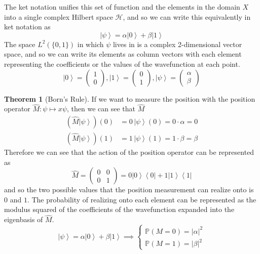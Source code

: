 \documentclass{article}
\newcommand{\ket}[1]{\ensuremath{\left|#1\right\rangle}}
\newcommand{\bra}[1]{\ensuremath{\left\langle#1\right|}}
\theoremstyle{definition}
\newtheorem{theorem}{Theorem}[section]
\begin{document}
  The ket notation unifies this set of function and the elements in the domain $X$ into a single complex Hilbert space $\mathcal{H}$, and so we can write this equivalently in ket notation as 
  \begin{equation} 
    \ket{\psi} = \alpha \ket{0} + \beta \ket{1} 
  \end{equation}
  The space $L^2(\{0, 1\})$ in which $\psi$ lives in is a complex 2-dimensional vector space, and so we can write its elements as column vectors with each element representing the coefficients or the values of the wavefunction at each point. 
  \begin{equation} 
    \ket{0} = \begin{pmatrix} 1 \\ 0 \end{pmatrix}, \ket{1} = \begin{pmatrix} 0 \\ 1 \end{pmatrix}, \ket{\psi} = \begin{pmatrix} \alpha \\ \beta \end{pmatrix}
  \end{equation}

  \begin{theorem}[Born's Rule]
    If we want to measure the position with the position operator $\hat{M}: \psi \mapsto x \psi$, then we can see that $\hat{M}$ 
    \begin{align} 
      (\hat{M} \ket{\psi}) (0) & = 0 \, \ket{\psi}(0) = 0 \cdot \alpha = 0 \\ 
      (\hat{M} \ket{\psi}) (1) & = 1 \, \ket{\psi}(1) = 1 \cdot \beta = \beta 
    \end{align}
    Therefore we can see that the action of the position operator can be represented as 
    \begin{equation} 
      \hat{M} = \begin{pmatrix} 0 & 0 \\ 0 & 1 \end{pmatrix} = 0 \ket{0} \bra{0} + 1 \ket{1} \bra{1}
    \end{equation} 
    and so the two possible values that the position measurement can realize onto is $0$ and $1$. The probability of realizing onto each element can be represented as the modulus squared of the coefficients of the wavefunction expanded into the eigenbasis of $\hat{M}$. 
    \begin{equation} 
      \ket{\psi} = \alpha \ket{0} + \beta \ket{1} \implies \begin{cases} \mathbb{P}(M = 0) = |\alpha|^2 \\ \mathbb{P}(M = 1) = |\beta|^2 \end{cases}
    \end{equation}    
  \end{theorem}
\end{document}
